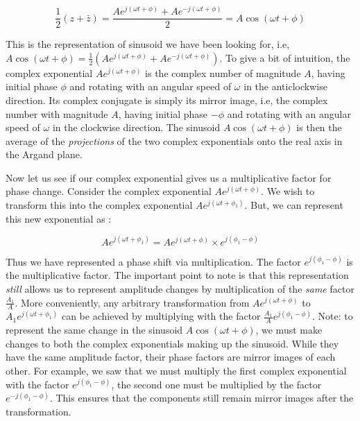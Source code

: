 \documentclass{article}
\theoremstyle{definition}
\begin{document}
		\[ 
			\frac{1}{2}(z + \bar{z}) = \frac{Ae^{j(\omega t + \phi)} + Ae^{-j(\omega t + \phi)}}{2} = A\cos(\omega t + \phi)
		\]
		
		This is the representation of sinusoid we have been looking for, i.e, $A\cos(\omega t + \phi) = \frac{1}{2}(Ae^{j(\omega t + \phi)} + Ae^{-j(\omega t + \phi)})$. To give a bit of intuition, the complex exponential $Ae^{j(\omega t + \phi)}$ is the complex number of magnitude $A$, having initial phase $\phi$ and rotating with an angular speed of $\omega$ in the anticlockwise direction. Its complex conjugate is simply its mirror image, i.e, the complex number with magnitude $A$, having initial phase $-\phi$ and rotating with an angular speed of $\omega$ in the clockwise direction. The sinusoid $A\cos(\omega t + \phi)$ is then the average of the \textit{projections} of the two complex exponentials onto the real axis in the Argand plane. \smallskip
		
		Now let us see if our complex exponential gives us a multiplicative factor for phase change. Consider the complex exponential $Ae^{j(\omega t + \phi)}$. We wish to transform this into the complex exponential $Ae^{j(\omega t + \phi_1)}$. But, we can represent this new exponential as : 
		
		\[ 
			Ae^{j(\omega t + \phi_1)} = Ae^{j(\omega t + \phi)} \times e^{j(\phi_1 - \phi)}
		\]
		
		Thus we have represented a phase shift via multiplication. The factor $e^{j(\phi_1 - \phi)}$ is the multiplicative factor. The important point to note is that this representation \textit{still} allows us to represent amplitude changes by multiplication of the \textit{same} factor $\frac{A_1}{A}$. More conveniently, any arbitrary transformation from $Ae^{j(\omega t + \phi)}$ to $A_1e^{j(\omega t + \phi_1)}$ can be achieved by multiplying with the factor $\frac{A_1}{A} e^{j(\phi_1 - \phi)}$. Note: to represent the same change in the sinusoid $A\cos(\omega t + \phi)$, we must make changes to both the complex exponentials making up the sinusoid. While they have the same amplitude factor, their phase factors are mirror images of each other. For example, we saw that we must multiply the first complex exponential with the factor $e^{j(\phi_1 - \phi)}$, the second one must be multiplied by the factor $e^{-j(\phi_1 - \phi)}$. This ensures that the components still remain mirror images after the transformation. \smallskip
		
\end{document}
